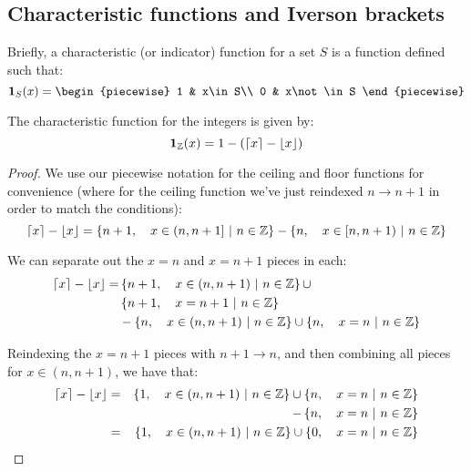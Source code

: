 \subsection{Characteristic functions and Iverson brackets}
Briefly, a characteristic (or indicator) function for a set $S$ is a function defined such that:
$$
    \mathbf{1}_{S}(x)=\begin{piecewise}
        1 & x\in S\\
        0 & x\not\in S
    \end{piecewise}
$$

\begin{theorem}
    The characteristic function for the integers is given by:
    $$
        \mathbf{1}_{\mathbb{Z}}(x)=1-(\lceil x\rceil-\lfloor x\rfloor)
    $$

    \begin{proof}
        We use our piecewise notation for the ceiling and floor functions for convenience (where for the ceiling function we've just reindexed $n\to n+1$ in order to match the conditions):
        $$
            \lceil x\rceil-\lfloor x\rfloor=\left\{n+1,\quad x\in(n,n+1]\ \middle|\ n\in\mathbb{Z}\right\}-\left\{n,\quad x\in[n,n+1)\ \middle|\ n\in\mathbb{Z}\right\}
        $$

        We can separate out the $x=n$ and $x=n+1$ pieces in each:
        \begin{align*}
            \lceil x\rceil-\lfloor x\rfloor = &\left\{n+1,\quad x\in(n,n+1)\ \middle|\ n\in\mathbb{Z}\right\}\cup\\
                                    &\left\{n+1,\quad x=n+1\ \middle|\ n\in\mathbb{Z}\right\}\\
                               &-\left\{n,\quad x\in(n,n+1)\ \middle|\ n\in\mathbb{Z}\right\}\cup\left\{n,\quad x=n\ \middle|\ n\in\mathbb{Z}\right\}
        \end{align*}

        Reindexing the $x=n+1$ pieces with $n+1\to n$, and then combining all pieces for $x\in(n,n+1)$, we have that:
        \begin{align*}
            \lceil x\rceil-\lfloor x\rfloor &= &\left\{1,\quad x\in(n,n+1)\ \middle|\ n\in\mathbb{Z}\right\}\cup\left\{n,\quad x=n\ \middle|\ n\in\mathbb{Z}\right\}\\
                               &&-\left\{n,\quad x=n\ \middle|\ n\in\mathbb{Z}\right\} \\
                               &= &\left\{1,\quad x\in(n,n+1)\ \middle|\ n\in\mathbb{Z}\right\}\cup\left\{0,\quad x=n\ \middle|\ n\in\mathbb{Z}\right\}\\
        \end{align*}


\end{proof}
\end{theorem}

